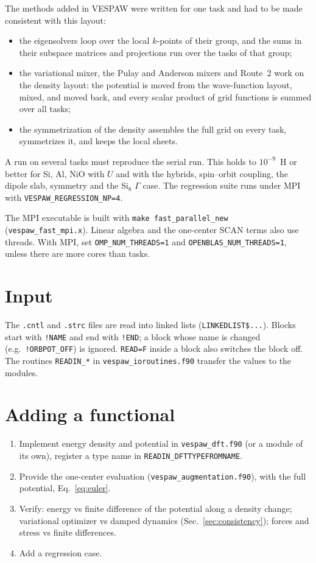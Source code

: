 \documentclass[11pt,a4paper,oneside]{book}
\begin{document}
The methods added in VESPAW were written for one task and had to be made
consistent with this layout:
\begin{itemize}
\item the eigensolvers loop over the local $k$-points of their group, and
  the sums in their subspace matrices and projections run over the tasks
  of that group;
\item the variational mixer, the Pulay and Anderson mixers and Route~2
  work on the density layout: the potential is moved from the
  wave-function layout, mixed, and moved back, and every scalar product of
  grid functions is summed over all tasks;
\item the symmetrization of the density assembles the full grid on every
  task, symmetrizes it, and keeps the local sheets.
\end{itemize}
A run on several tasks must reproduce the serial run. This holds to
$10^{-9}$~H or better for Si, Al, NiO with $U$ and with the hybrids,
spin--orbit coupling, the dipole slab, symmetry and the Si$_8$ $\Gamma$ case.
The regression suite runs under MPI with
\texttt{VESPAW\_REGRESSION\_NP=4}.

The MPI executable is built with \texttt{make fast\_parallel\_new}
(\texttt{vespaw\_fast\_mpi.x}). Linear algebra and the one-center SCAN
terms also use threads. With MPI, set \texttt{OMP\_NUM\_THREADS=1} and
\texttt{OPENBLAS\_NUM\_THREADS=1}, unless there are more cores than
tasks.

\section{Input}

The \texttt{.cntl} and \texttt{.strc} files are read into linked lists
(\texttt{LINKEDLIST\$...}). Blocks start with \texttt{!NAME} and end with
\texttt{!END}; a block whose name is changed (e.g.\
\texttt{!ORBPOT\_OFF}) is ignored. \texttt{READ=F} inside a block also
switches the block off. The routines \texttt{READIN\_*} in
\texttt{vespaw\_ioroutines.f90} transfer the values to the modules.

\section{Adding a functional}

\begin{enumerate}
\item Implement energy density and potential in \texttt{vespaw\_dft.f90}
  (or a module of its own), register a type name in
  \texttt{READIN\_DFTTYPEFROMNAME}.
\item Provide the one-center evaluation (\texttt{vespaw\_augmentation.f90}),
  with the full potential, Eq.~\eqref{eq:euler}.
\item Verify: energy vs finite difference of the potential along a
  density change; variational optimizer vs damped dynamics
  (Sec.~\ref{sec:consistency}); forces and stress vs finite differences.
\item Add a regression case.
\end{enumerate}
\end{document}
